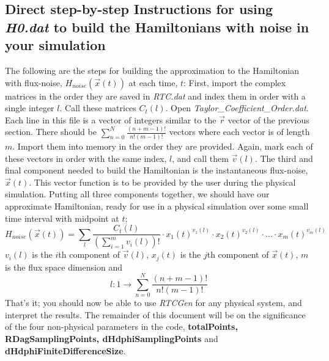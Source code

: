 \documentclass[12pt]{article}
\begin{document}
\subsection{Direct step-by-step Instructions for using \textit{H0.dat} to build the Hamiltonians with noise in your simulation}
The following are the steps for building the approximation to the Hamiltonian with flux-noise, $H_{noise}(\vec{x}(t))$ at each time, $t$:
\newline
\newline
First, import the complex matrices in the order they are saved in \textit{RTC.dat} and index them in order with a single integer $l$. Call these matrices $C_t(l)$.
\newline
\newline
Open \textit{Taylor\_Coefficient\_Order.dat}. Each line in this file is a vector of integers similar to the $\vec{r}$ vector of the previous section. There should be $\sum_{n=0}^N \frac{(n+m-1)!}{n!(m-1)!}$ vectors where each vector is of length $m$. Import them into memory in the order they are provided. Again, mark each of these vectors in order with the same index, $l$, and call them $\vec{v}(l)$.
\newline
\newline
The third and final component needed to build the Hamiltonian is the instantaneous flux-noise, $\vec{x}(t)$. This vector function is to be provided by the user during the physical simulation.
\newline
\newline
Putting all three components together, we should have our approximate Hamiltonian, ready for use in a physical simulation over some small time interval with midpoint at  $t$;
\begin{equation}
\boxed{H_{noise}(\vec{x}(t)) = \sum_l \frac{C_t(l)}{(\sum_{i=1}^m v_i(l) )!} \cdot x_1(t)^{v_1(l)} \cdot x_2(t)^{v_2(l)} \cdot ... \cdot x_m(t)^{v_m(l)}}
\end{equation}
$v_i(l)$ is the $i$th component of $\vec{v}(l)$, $x_j(t)$ is the $j$th component of $\vec{x}(t)$, $m$ is the flux space dimension and
\begin{equation}
l:1 \rightarrow \sum_{n=0}^N \frac{(n+m-1)!}{n! (m-1)!}
\end{equation}
That's it; you should now be able to use \textit{RTCGen} for any physical system, and interpret the results. 
\newline
\newline
The remainder of this document will be on the significance of the four non-physical parameters in the code, \textbf{totalPoints, RDagSamplingPoints, dHdphiSamplingPoints} and \textbf{dHdphiFiniteDifferenceSize}.
\end{document}
